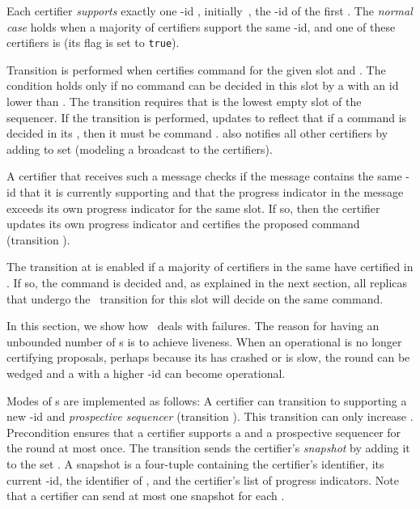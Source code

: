 \label{sec:bev-normal}

Each certifier  \emph{supports}
exactly one {\round}-id , initially~, the {\round}-id of the
first {\round}.
The \emph{normal case} holds when a majority of certifiers support
the same {\round}-id, and one of these certifiers is {\sequencer} (its  flag is set to \texttt{true}).

Transition 
is performed when {\sequencer}  certifies command  for the given slot
and {\round}.
The condition 
holds only if no command can be decided in this slot
by a {\round} with an id lower than .
The transition requires that  is the lowest empty slot of the
sequencer.
If the transition is performed,
 updates  to reflect that if a command is
decided in its {\round}, then it must be command .
{\Sequencer}  also notifies all other certifiers by adding
 to set 
(modeling a broadcast to the certifiers).

A certifier that receives such a message checks if the message
contains the same {\round}-id that it is currently supporting and that
the progress indicator in the message exceeds its own progress
indicator for the same slot.  If so, then the certifier updates its
own progress indicator and certifies the proposed command (transition
).


The 
transition at  is enabled if a majority of
certifiers in the same {\round} have certified  in .
If so, the command is decided and, as explained in the next section,
all replicas that undergo the \observedecision\ transition
for this slot will decide on the same command.

\label{sec:recovery}

In this section, we show how \multiconsensus\ deals with failures.
The reason for having an unbounded number of {\round}s is to achieve liveness.
When an operational {\round} is no longer certifying proposals,
perhaps because its {\sequencer} has crashed or is slow,
the round can be
wedged and a {\round} with a higher {\round}-id can become operational.

Modes of {\round}s are implemented as follows:
A certifier  can transition to supporting a new {\round}-id
 and \emph{prospective sequencer} 
(transition ).
This transition can only increase .
Precondition  ensures that a certifier supports a {\round} and a prospective sequencer for the round at most once.
The transition sends the certifier's \emph{snapshot} by adding it to the
set .
A snapshot is a four-tuple  containing
the certifier's identifier, its current {\round}-id, the identifier of , and
the certifier's list of progress indicators.
Note that a certifier can send at most one snapshot for each {\round}.

